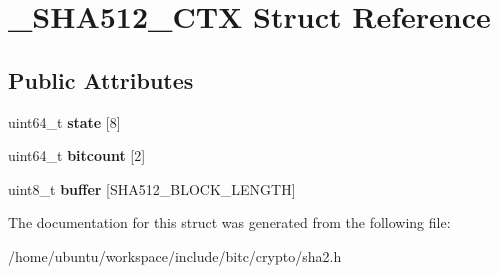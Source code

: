 \hypertarget{struct__SHA512__CTX}{\section{\-\_\-\-S\-H\-A512\-\_\-\-C\-T\-X Struct Reference}
\label{struct__SHA512__CTX}
}
\subsection*{Public Attributes}
\begin{DoxyCompactItemize}
\item 
\hypertarget{struct__SHA512__CTX_a9a53dc66589d57d3e34d68a983252fc9}{uint64\-\_\-t {\bfseries state} \mbox{[}8\mbox{]}}\label{struct__SHA512__CTX_a9a53dc66589d57d3e34d68a983252fc9}

\item 
\hypertarget{struct__SHA512__CTX_a6545d179b1f548c14adb1ee7f900de6a}{uint64\-\_\-t {\bfseries bitcount} \mbox{[}2\mbox{]}}\label{struct__SHA512__CTX_a6545d179b1f548c14adb1ee7f900de6a}

\item 
\hypertarget{struct__SHA512__CTX_a218417630503a9591d36d0ee63eca048}{uint8\-\_\-t {\bfseries buffer} \mbox{[}S\-H\-A512\-\_\-\-B\-L\-O\-C\-K\-\_\-\-L\-E\-N\-G\-T\-H\mbox{]}}\label{struct__SHA512__CTX_a218417630503a9591d36d0ee63eca048}

\end{DoxyCompactItemize}


The documentation for this struct was generated from the following file\-:\begin{DoxyCompactItemize}
\item 
/home/ubuntu/workspace/include/bitc/crypto/sha2.\-h\end{DoxyCompactItemize}
